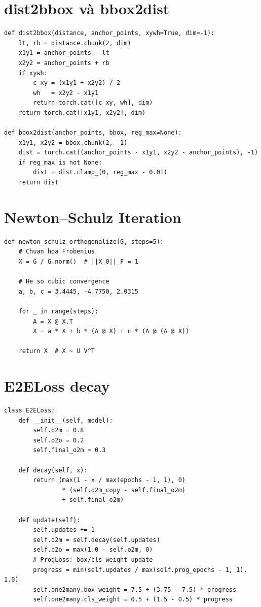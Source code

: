 \section{dist2bbox và bbox2dist}

\begin{lstlisting}[caption={dist2bbox --- Chuyển LTRB distances thành bounding box}]
def dist2bbox(distance, anchor_points, xywh=True, dim=-1):
    lt, rb = distance.chunk(2, dim)
    x1y1 = anchor_points - lt
    x2y2 = anchor_points + rb
    if xywh:
        c_xy = (x1y1 + x2y2) / 2
        wh   = x2y2 - x1y1
        return torch.cat([c_xy, wh], dim)
    return torch.cat([x1y1, x2y2], dim)

def bbox2dist(anchor_points, bbox, reg_max=None):
    x1y1, x2y2 = bbox.chunk(2, -1)
    dist = torch.cat((anchor_points - x1y1, x2y2 - anchor_points), -1)
    if reg_max is not None:
        dist = dist.clamp_(0, reg_max - 0.01)
    return dist
\end{lstlisting}

\section{Newton--Schulz Iteration}

\begin{lstlisting}[caption={Newton--Schulz orthogonalization trong Muon optimizer}]
def newton_schulz_orthogonalize(G, steps=5):
    # Chuan hoa Frobenius
    X = G / G.norm()  # ||X_0||_F = 1

    # He so cubic convergence
    a, b, c = 3.4445, -4.7750, 2.0315

    for _ in range(steps):
        A = X @ X.T
        X = a * X + b * (A @ X) + c * (A @ (A @ X))

    return X  # X ~ U V^T
\end{lstlisting}

\section{E2ELoss decay}

\begin{lstlisting}[caption={E2ELoss --- Progressive decay O2M/O2O weights}]
class E2ELoss:
    def __init__(self, model):
        self.o2m = 0.8
        self.o2o = 0.2
        self.final_o2m = 0.3

    def decay(self, x):
        return (max(1 - x / max(epochs - 1, 1), 0)
                * (self.o2m_copy - self.final_o2m)
                + self.final_o2m)

    def update(self):
        self.updates += 1
        self.o2m = self.decay(self.updates)
        self.o2o = max(1.0 - self.o2m, 0)
        # ProgLoss: box/cls weight update
        progress = min(self.updates / max(self.prog_epochs - 1, 1), 1.0)
        self.one2many.box_weight = 7.5 + (3.75 - 7.5) * progress
        self.one2many.cls_weight = 0.5 + (1.5 - 0.5) * progress
\end{lstlisting}

